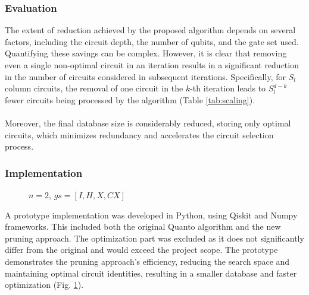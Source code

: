 \subsubsection{Evaluation}
The extent of reduction achieved by the proposed algorithm depends on several factors, including the circuit depth, the number of qubits, and the gate set used. Quantifying these savings can be complex. However, it is clear that removing even a single non-optimal circuit in an iteration results in a significant reduction in the number of circuits considered in subsequent iterations. Specifically, for $S_l$ column circuits, the removal of one circuit in the $k$-th iteration leads to $S_l^{d-k}$ fewer circuits being processed by the algorithm (Table \ref{tab:scaling}).
\\\\
Moreover, the final database size is considerably reduced, storing only optimal circuits, which minimizes redundancy and accelerates the circuit selection process.

\subsubsection{Implementation}
\begin{figure}
  \caption{$n = 2$, $gs=[I,H,X,CX]$}
  \label{fig:comp}
\end{figure}
A prototype implementation was developed in Python, using Qiskit and Numpy frameworks. This included both the original Quanto algorithm and the new pruning approach. The optimization part was excluded as it does not significantly differ from the original and would exceed the project scope. The prototype demonstrates the pruning approach's efficiency, reducing the search space and maintaining optimal circuit identities, resulting in a smaller database and faster optimization (Fig. \ref{fig:comp}).







